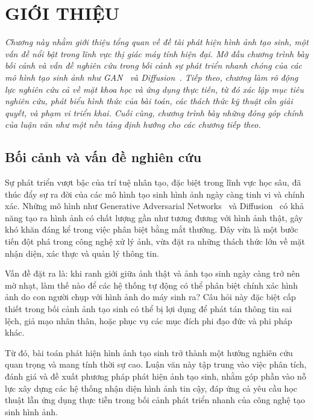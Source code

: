 \chapter{GIỚI THIỆU}
\label{Chapter1}
%
\textit{
Chương này nhằm giới thiệu tổng quan về đề tài phát hiện hình ảnh tạo sinh, một vấn đề nổi bật trong lĩnh vực thị giác máy tính hiện đại. Mở đầu chương trình bày bối cảnh và vấn đề nghiên cứu trong bối cảnh sự phát triển nhanh chóng của các mô hình tạo sinh ảnh như GAN~\cite{Goodfellow2014GenerativeAN} và Diffusion~\cite{Ho2020DenoisingDP}. Tiếp theo, chương làm rõ động lực nghiên cứu cả về mặt khoa học và ứng dụng thực tiễn, từ đó xác lập mục tiêu nghiên cứu, phát biểu hình thức của bài toán, các thách thức kỹ thuật cần giải quyết, và phạm vi triển khai. Cuối cùng, chương trình bày những đóng góp chính của luận văn như một nền tảng định hướng cho các chương tiếp theo.
}\\
%
\section{Bối cảnh và vấn đề nghiên cứu}

Sự phát triển vượt bậc của trí tuệ nhân tạo, đặc biệt trong lĩnh vực học sâu, đã thúc đẩy sự ra đời của các mô hình tạo sinh hình ảnh ngày càng tinh vi và chính xác. Những mô hình như Generative Adversarial Networks~\cite{Goodfellow2014GenerativeAN} và Diffusion~\cite{Ho2020DenoisingDP} có khả năng tạo ra hình ảnh có chất lượng gần như tương đương với hình ảnh thật, gây khó khăn đáng kể trong việc phân biệt bằng mắt thường. Đây vừa là một bước tiến đột phá trong công nghệ xử lý ảnh, vừa đặt ra những thách thức lớn về mặt nhận diện, xác thực và quản lý thông tin.

Vấn đề đặt ra là: khi ranh giới giữa ảnh thật và ảnh tạo sinh ngày càng trở nên mờ nhạt, làm thế nào để các hệ thống tự động có thể phân biệt chính xác hình ảnh do con người chụp với hình ảnh do máy sinh ra? Câu hỏi này đặc biệt cấp thiết trong bối cảnh ảnh tạo sinh có thể bị lợi dụng để phát tán thông tin sai lệch, giả mạo nhân thân, hoặc phục vụ các mục đích phi đạo đức và phi pháp khác.

Từ đó, bài toán phát hiện hình ảnh tạo sinh trở thành một hướng nghiên cứu quan trọng và mang tính thời sự cao. Luận văn này tập trung vào việc phân tích, đánh giá và đề xuất phương pháp phát hiện ảnh tạo sinh, nhằm góp phần vào nỗ lực xây dựng các hệ thống nhận diện hình ảnh tin cậy, đáp ứng cả yêu cầu học thuật lẫn ứng dụng thực tiễn trong bối cảnh phát triển nhanh của công nghệ tạo sinh hình ảnh.
%
